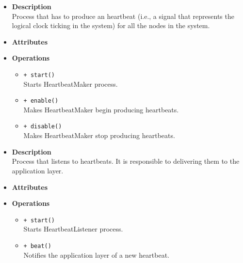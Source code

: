 \FloatBarrier
\begin{itemize}
  \item \textbf{Description} \\
    Process that has to produce an heartbeat (i.e., a signal that represents
    the logical clock ticking in the system) for all the nodes in the
    system.
  \item \textbf{Attributes}
  \item \textbf{Operations}
  \begin{itemize}
    \item \texttt{+ start()} \\
    Starts HeartbeatMaker process.
    \item \texttt{+ enable()} \\
    Makes HeartbeatMaker begin producing heartbeats.
    \item \texttt{+ disable()} \\
    Makes HeartbeatMaker stop producing heartbeats.
  \end{itemize}
\end{itemize}

\FloatBarrier
\begin{itemize}
  \item \textbf{Description} \\
    Process that listens to heartbeats. It is responsible to delivering them
    to the application layer.
  \item \textbf{Attributes}
  \item \textbf{Operations}
  \begin{itemize}
    \item \texttt{+ start()} \\
    Starts HeartbeatListener process.
    \item \texttt{+ beat()} \\
    Notifies the application layer of a new heartbeat.
  \end{itemize}
\end{itemize}
